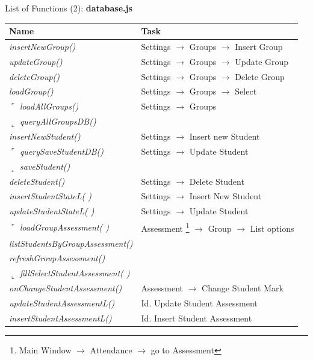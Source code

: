 \begin{bclogo}[couleur=orange!30,logo=\bcbook, arrondi=0.1,ombre=true ] 
{List of Functions (2): {\bf database.js}}	
\begin{tabular}{ll}
Name                    & Task            \\
\hline

\emph{ insertNewGroup()}               &{ Settings $\rightarrow$ Groups  $\rightarrow$ Insert Group }   \\
\emph{ updateGroup()  }                &{ Settings $\rightarrow$ Groups  $\rightarrow$ Update Group  }\\
\emph{ deleteGroup() }                 &{  Settings $\rightarrow$ Groups  $\rightarrow$ Delete Group } \\
\emph{ loadGroup()             }        & { Settings $\rightarrow$ Groups  $\rightarrow$ Select  } \\

$\ulcorner$ \emph{ loadAllGroups()         }        & {  Settings $\rightarrow$ Groups  }  \\
$\llcorner$\emph{ queryAllGroupsDB()      }        & {}  \\
\emph{ insertNewStudent() }            & { Settings  $\rightarrow$  Insert new Student  } \\
$\ulcorner$ \emph{ querySaveStudentDB() }          &  Settings  $\rightarrow$  Update Student \\
$\llcorner$ \emph{ saveStudent() }                 & { } \\
\emph{ deleteStudent()}                & { Settings  $\rightarrow$  Delete Student } \\
\emph{ insertStudentStateL( ) }         & { Settings  $\rightarrow$  Insert New Student  }\\
\emph{ updateStudentStateL( )  }        & { Settings  $\rightarrow$   Update Student }\\

$\ulcorner$ \emph { loadGroupAssessment(  ) }       & { Assessment  \footnote{Main Window $\rightarrow$ Attendance $\rightarrow$ go to Assessment} $\rightarrow$ Group $\rightarrow$  List options  } \\
\emph { listStudentsByGroupAssessment()} & {  } \\
\emph { refreshGroupAssessment()}       & { } \\
$\llcorner$ \emph { fillSelectStudentAssessment( )}  & {  }\\

\emph { onChangeStudentAssessment() }   & { Assessment  $\rightarrow$  Change Student Mark  } \\
\emph { updateStudentAssessmentL() }    & { Id.  Update Student Assessment} \\
\emph { insertStudentAssessmentL() }    &{  Id.  Insert Student Assessment }\\


\end{tabular}
\end{bclogo}
